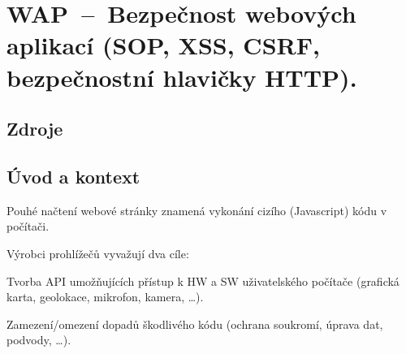 

\graphicspath{{wap/bezpecnost_webovych_aplikaci/figures}}


\chapter{WAP~--~Bezpečnost webových aplikací (SOP, XSS, CSRF, bezpečnostní hlavičky HTTP).}


\section{Zdroje}

\begin{compactitem}
    \item {}
    \item {}
\end{compactitem}


\section{Úvod a kontext}

\begin{compactitem}
    \item Pouhé načtení webové stránky znamená vykonání cizího (Javascript) kódu v počítači.

    \item Výrobci prohlížečů vyvažují dva cíle: \begin{compactitem}
        \item Tvorba API umožňujících přístup k HW a SW uživatelského počítače (grafická karta, geolokace, mikrofon, kamera, \ldots).

        \item Zamezení/omezení dopadů škodlivého kódu (ochrana soukromí, úprava dat, podvody, \ldots).
    \end{compactitem}
\end{compactitem}

